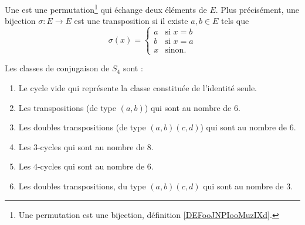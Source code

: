 \begin{definition}[transposition]      \label{DEFooXNAFooGTbTTJ}
	Une  est une permutation\footnote{Une permutation est une bijection, définition \ref{DEFooJNPIooMuzIXd}.} qui échange deux éléments de \( E\). Plus précisément, une bijection \( \sigma\colon E\to E\) est une transposition si il existe \( a,b\in E\) tels que
	\begin{equation}
		\sigma(x)=\begin{cases}
			a & \text{si } x=b \\
			b & \text{si } x=a \\
			x & \text{sinon. }
		\end{cases}
	\end{equation}
\end{definition}

\begin{example} \label{ExVYZPzub}
\end{example}


\begin{proposition}	\label{PROPooQRZYooKVZTCJ}
	Les classes de conjugaison de \( S_4\) sont :
	\begin{enumerate}
		\item		\label{ITEMooZIYYooCqpicx}
		      Le cycle vide qui représente la classe constituée de l'identité seule.
		\item \label{ITEMooVDLGooFOkgzc}
		      Les transpositions (de type \( (a,b)\)) qui sont au nombre de \( 6\).
		\item	\label{ITEMooWKUIooTedZAA}
		      Les doubles transpositions (de type \( (a,b)(c,d)\)) qui sont au nombre de \( 6\).
		\item		\label{ITEMooMHRWooSkUveJ}
		      Les \( 3\)-cycles qui sont au nombre de \( 8\).
		\item		\label{ITEMooCBYNooZmFsBd}
		      Les \( 4\)-cycles qui sont au nombre de \( 6\).

		\item       \label{ITEMooGCMYooKZgFHX}
		      Les doubles transpositions, du type \( (a,b)(c,d)\) qui sont au nombre de \( 3\).
	\end{enumerate}
\end{proposition}

